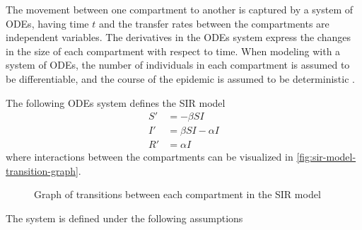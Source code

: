 The movement between one compartment to another is captured by a system of \glspl{ODE}, having time $t$ and the transfer rates between the compartments are independent variables.
The derivatives in the \glspl{ODE} system express the changes in the size of each compartment with respect to time.
When modeling with a system of \glspl{ODE}, the number of individuals in each compartment is assumed to be differentiable, and the course of the epidemic is assumed to be deterministic \cite{brauerCompartmentalModelsEpidemiology2008}.

The following \glspl{ODE} system defines the \gls{SIR} model \cite{brauerCompartmentalModelsEpidemiology2008, kermackContributionMathematicalTheory1927}
\begin{equation}
    \begin{aligned}
        S' &= - \beta S I \\
        I' &= \beta S I - \alpha I \\
        R' &= \alpha I
    \end{aligned}
\end{equation}
where interactions between the compartments can be visualized in \autoref{fig:sir-model-transition-graph}.
\begin{figure}
    \centering
    \caption{Graph of transitions between each compartment in the SIR model}
    \label{fig:sir-model-transition-graph}
\end{figure}
The system is defined under the following assumptions \cite{brauerCompartmentalModelsEpidemiology2008, kermackContributionMathematicalTheory1927}
